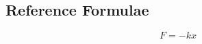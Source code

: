 \documentclass[student]{physicsquiz}
\begin{document}
\begin{quizquestionbank}[1]
  
\end{quizquestionbank}
\begin{quizreferencecontent}
  \section{Reference Formulae}
  \[F=-kx\]
\end{quizreferencecontent}
\end{document}
